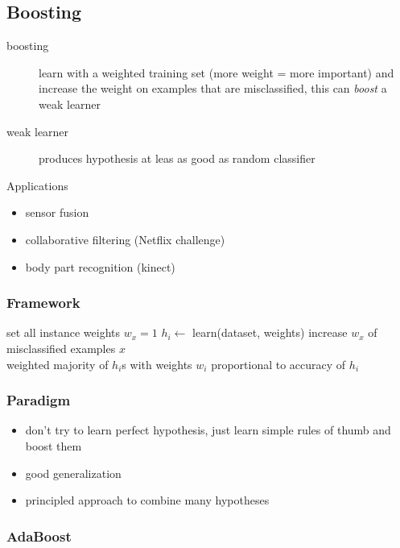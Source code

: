 \documentclass[]{article}
\theoremstyle{definition}
\begin{document}
\subsection{Boosting}
\label{sub:boosting}
\begin{description}
    \item[boosting] learn with a weighted training set (more weight = more important) and increase the weight on examples that are misclassified, this can \textit{boost} a weak learner
    \item[weak learner] produces hypothesis at leas as good as random classifier
\end{description}

Applications
\begin{itemize}
    \item sensor fusion
    \item collaborative filtering (Netflix challenge)
    \item body part recognition (kinect)
\end{itemize}

\subsubsection{Framework}
\label{ssub:Framework}

\begin{algorithmic}
    \State set all instance weights $w_x = 1$    
    \Repeat
    \State $h_i \gets$ learn(dataset, weights)
    \State increase $w_x$ of misclassified examples $x$
     \\
    \Return weighted majority of $h_i$s with weights $w_i$ proportional to accuracy of $h_i$
\end{algorithmic}

\subsubsection{Paradigm}
\label{ssub:Paradigm}

\begin{itemize}
    \item don't try to learn perfect hypothesis, just learn simple rules of thumb and boost them
    \item good generalization
    \item principled approach to combine many hypotheses
\end{itemize}

\subsubsection{AdaBoost}
\label{ssub:AdaBoost}
\end{document}
